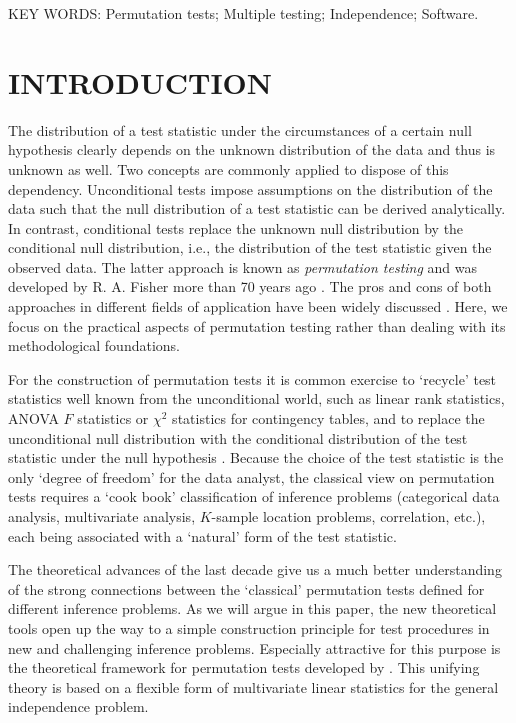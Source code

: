 \documentclass{article}
\begin{document}
\noindent
KEY WORDS: Permutation tests; Multiple testing; Independence; Software.
\newline

\newpage

\section{INTRODUCTION}

The distribution of a test statistic under the circumstances of a certain
null hypothesis clearly depends on the unknown distribution of the data and
thus is unknown as well.
Two concepts are commonly applied to dispose of this dependency.
Unconditional tests impose assumptions on the distribution of the data such
that the null distribution of a test statistic can be derived analytically. In contrast, 
conditional tests
replace the unknown null distribution by the conditional null distribution,
i.e., the distribution of the test statistic given the observed data. The
latter approach is known as \textit{permutation testing} and was developed
by R. A. Fisher more than 70 years ago \citep{Fisher1935}. 
The pros and cons of both approaches in different fields of application 
have been widely discussed \citep[e.g.~by][]{why-permut:1998,pros-and-c:2000,Shuster2005}.
Here, we focus on the practical aspects of permutation testing rather than
dealing with its methodological foundations.

For the construction of permutation tests it is common exercise to `recycle'
test statistics well known from the unconditional world, such as linear rank
statistics, ANOVA $F$ statistics or $\chi^2$ statistics for
contingency tables, and to replace the unconditional null distribution with
the conditional distribution of the test statistic under the null
hypothesis \citep{Edgington1987,Good2000,Pesarin2001,Ernst2004}. 
Because the choice of the test statistic is the only `degree of freedom' for
the data analyst,
the classical view on permutation tests requires 
a `cook book' classification of inference problems (categorical data
analysis, multivariate analysis, $K$-sample location problems, correlation,
etc.), each being associated with a `natural' form of the test statistic.

The theoretical advances of the last decade \citep[notably][]{StrasserWeber1999,JanssenPauls2003}
give us a much better understanding of the strong connections between the 
`classical' permutation tests defined for different inference problems. 
As we will argue in this paper, the new
theoretical tools open up the way to a simple construction principle 
for test procedures in new and challenging inference problems.
Especially attractive for this purpose is the theoretical framework for
permutation tests developed by \cite{StrasserWeber1999}. This unifying
theory is based on a flexible form of multivariate linear statistics for the
general independence problem. 
\end{document}
